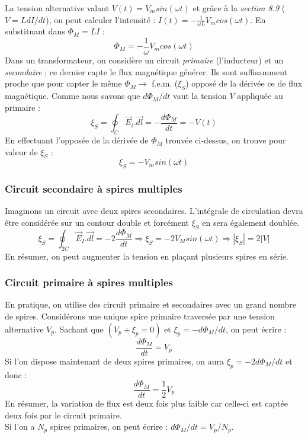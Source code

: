 \documentclass	[11pt, a4paper, openany]{book}
\begin{document}
La tension alternative valant $V(t) = V_m sin(\omega t)$ et grâce à la \textit{section 8.9} ($V = LdI / dt$), on peut calculer l'intensité : $I(t) = -\frac{1}{\omega L}V_m cos(\omega t)$. En substituant dans $\Phi_M = LI$ :
\begin{equation}
	\Phi_M = -\frac{1}{\omega}V_m cos(\omega t)
\end{equation}
Dans un transformateur, on considère un circuit \textit{primaire} (l'inducteur) et un \textit{secondaire} ; ce dernier capte le flux magnétique générer. Ils sont suffisamment proche que pour capter le même $\Phi_M \rightarrow$ f.e.m. ($\xi_S$) opposé de la dérivée ce de flux magnétique. Comme nous savons que $d\Phi_M/dt$ vaut la tension $V$ appliquée au primaire : 
\begin{equation}
	\xi_S = \oint_C \vec{E}_i.\vec{dl} = - \frac{d\Phi_M}{dt} = - V(t)
\end{equation}
En effectuant l'opposée de la dérivée de $\Phi_M$ trouvée ci-dessus, on trouve pour valeur de $\xi_S$ :
\begin{equation}
	\xi_S = - V_m sin(\omega t)
\end{equation}

\subsubsection{Circuit secondaire à spires multiples}
Imaginons un circuit avec deux spires secondaires. L'intégrale de circulation devra être considérée sur un contour double et forcément $\xi_S$ en sera également doublée.
\begin{equation}
	\xi_S = \oint_{2C} \vec{E}_I.\vec{dl} = -2\frac{d\Phi_M}{dt} \Rightarrow \xi_S = -2V_M sin(\omega t) \Rightarrow |\xi_S| = 2|V|
\end{equation}
En résumer, on peut augmenter la tension en plaçant plusieurs spires en série.

\subsubsection{Circuit primaire à spires multiples}
En pratique, on utilise des circuit primaire et secondaires avec un grand nombre de spires. Considérons une unique spire primaire traversée par une tension alternative $V_p$. Sachant que $(V_p + \xi_p = 0)$ et $\xi_p = -d\Phi_M/dt$, on peut écrire : 
\begin{equation}
	\frac{d\Phi_M}{dt} = V_p
\end{equation}
Si l'on dispose maintenant de deux spires primaires, on aura $\xi_p = -2d\Phi_M/dt$ et donc : 
\begin{equation}
	\frac{d\Phi_M}{dt} = \frac{1}{2}V_p
\end{equation}
En résumer, la variation de flux est deux fois plus faible car celle-ci est captée deux fois par le circuit primaire.\\
Si l'on a $N_p$ spires primaires, on peut écrire : $d\Phi_M/dt = V_p/N_p$.\\
\end{document}

